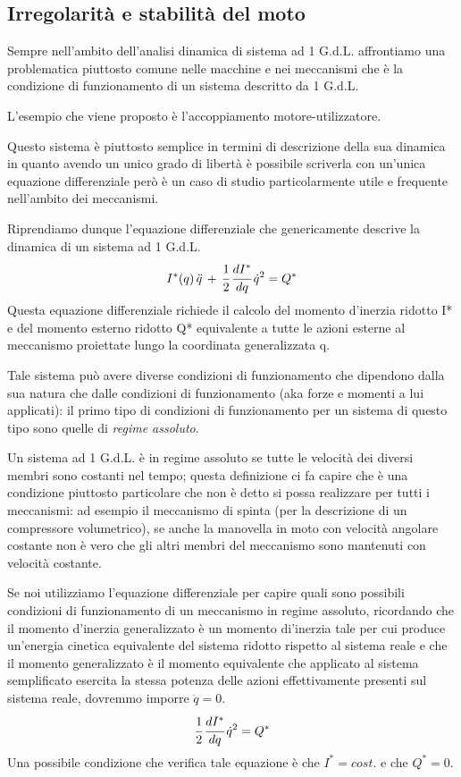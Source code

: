 \subsection{Irregolarità e stabilità del moto}

Sempre nell'ambito dell'analisi dinamica di sistema ad 1 G.d.L. affrontiamo una problematica piuttosto comune nelle macchine e nei meccanismi che è la condizione di funzionamento di un sistema descritto da 1 G.d.L.

L'esempio che viene proposto è l'accoppiamento motore-utilizzatore.

Questo sistema è piuttosto semplice in termini di descrizione della sua dinamica in quanto avendo un unico grado di libertà è possibile scriverla con un'unica equazione differenziale però è un caso di studio particolarmente utile e frequente nell'ambito dei meccanismi.

Riprendiamo dunque l'equazione differenziale che genericamente descrive la dinamica di un sistema ad 1 G.d.L.
\[I^*(q)\,\ddot{q}\,+\,\cfrac{1}{2}\,\cfrac{dI^*}{dq}\,\dot{q}^2 = Q^*\]
Questa equazione differenziale richiede il calcolo del momento d'inerzia ridotto I* e del momento esterno ridotto Q* equivalente a tutte le azioni esterne al meccanismo proiettate lungo la coordinata generalizzata q.

Tale sistema può avere diverse condizioni di funzionamento che dipendono dalla sua natura che dalle condizioni di funzionamento (aka forze e momenti a lui applicati): il primo tipo di condizioni di funzionamento per un sistema di questo tipo sono quelle di \emph{regime assoluto}.

Un sistema ad 1 G.d.L. è in regime assoluto se tutte le velocità dei diversi membri sono costanti nel tempo; questa definizione ci fa capire che è una condizione piuttosto particolare che non è detto si possa realizzare per tutti i meccanismi: ad esempio il meccanismo di spinta (per la descrizione di un compressore volumetrico), se anche la manovella in moto con velocità angolare costante non è vero che gli altri membri del meccanismo sono mantenuti con velocità costante.

Se noi utilizziamo l'equazione differenziale per capire quali sono possibili condizioni di funzionamento di un meccanismo in regime assoluto, ricordando che il momento d'inerzia generalizzato è un momento di'inerzia tale per cui produce un'energia cinetica equivalente del sistema ridotto rispetto al sistema reale e che il momento generalizzato è il momento equivalente che applicato al sistema semplificato esercita la stessa potenza delle azioni effettivamente presenti sul sistema reale, dovremmo imporre $\ddot{q} = 0$.
\[\cfrac{1}{2}\,\cfrac{dI^*}{dq}\,\dot{q}^2=Q^*\]
Una possibile condizione che verifica tale equazione è che $I^* = cost.$ e che $Q^* = 0$.

